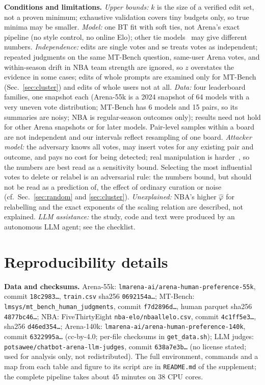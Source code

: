 \documentclass{article}
\begin{document}
\textbf{Conditions and limitations.} \emph{Upper bounds:} $k$ is the size of a verified edit set, not a proven minimum; exhaustive validation covers tiny budgets only, so true minima may be smaller. \emph{Model:} one BT fit with soft ties, not Arena's exact pipeline (no style control, no online Elo); other tie models~\citep{davidson1970,raokupper1967} may give different numbers. \emph{Independence:} edits are single votes and $\mathrm{se}$ treats votes as independent; repeated judgments on the same MT-Bench question, same-user Arena votes, and within-season drift in NBA team strength are ignored, so $z$ overstates the evidence in some cases; edits of whole prompts are examined only for MT-Bench (Sec.~\ref{sec:cluster}) and edits of whole users not at all. \emph{Data:} four leaderboard families, one snapshot each (Arena-55k is a 2024 snapshot of 64 models with a very uneven vote distribution; MT-Bench has 6 models and 15 pairs, so its summaries are noisy; NBA is regular-season outcomes only); results need not hold for other Arena snapshots or for later models. Pair-level samples within a board are not independent and our intervals reflect resampling of one board. \emph{Attacker model:} the adversary knows all votes, may insert votes for any existing pair and outcome, and pays no cost for being detected; real manipulation is harder~\citep{min2025rigging}, so the numbers are best read as a sensitivity bound. Selecting the most influential votes to delete or relabel is an adversarial rule: the numbers bound, but should not be read as a prediction of, the effect of ordinary curation or noise (cf.\ Sec.~\ref{sec:random} and \ref{sec:cluster}). \emph{Unexplained:} NBA's higher $\hat\varphi$ for relabelling and the exact exponents of the scaling relation are described, not explained. \emph{LLM assistance:} the study, code and text were produced by an autonomous LLM agent; see the checklist.




\appendix
\section{Reproducibility details}
\textbf{Data and checksums.} Arena-55k: \texttt{lmarena-ai/arena-human-preference-55k}, commit \texttt{18c2983\ldots}, \texttt{train.csv} sha256 \texttt{0692154a\ldots}; MT-Bench: \texttt{lmsys/mt\_bench\_human\_judgments}, commit \texttt{f7d2896d\ldots}, human parquet sha256 \texttt{4877bc46\ldots}; NBA: FiveThirtyEight \texttt{nba-elo/nbaallelo.csv}, commit \texttt{4c1ff5e3\ldots}, sha256 \texttt{d46ed354\ldots}; Arena-140k: \texttt{lmarena-ai/arena-human-preference-140k}, commit \texttt{6322995a\ldots} (cc-by-4.0; per-file checksums in \texttt{get\_data.sh}); LLM judges: \texttt{potsawee/chatbot-arena-llm-judges}, commit \texttt{638a7e3b\ldots} (no license stated; used for analysis only, not redistributed). The full environment, commands and a map from each table and figure to its script are in \texttt{README.md} of the supplement; the complete pipeline takes about 45 minutes on 38 CPU cores.
\end{document}
